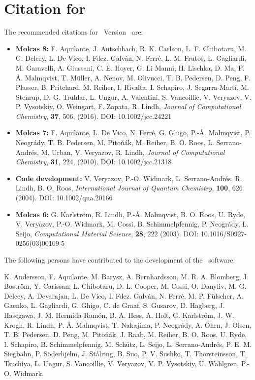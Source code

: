 
\section{Citation for \molcas}

The recommended citations for \molcas\ Version \molcasversion\ are:

\begin{itemize}

\item[] {\bf Molcas 8: } F. Aquilante, J. Autschbach, R. K. Carlson, L. F. Chibotaru,
M. G. Delcey, L. De Vico, I. Fdez. Galv\'an, N. Ferr\'e, L. M. Frutos, L. Gagliardi,
M. Garavelli, A. Giussani, C. E. Hoyer, G. Li Manni, H. Lischka, D. Ma, P. \AA. Malmqvist,
T. M\"uller, A. Nenov, M. Olivucci, T. B. Pedersen, D. Peng, F. Plasser, B. Pritchard,
M. Reiher, I. Rivalta, I. Schapiro, J. Segarra-Mart\'i, M. Stenrup, D. G. Truhlar,
L. Ungur, A. Valentini, S. Vancoillie, V. Veryazov, V. P. Vysotskiy, O. Weingart,
F. Zapata, R. Lindh, {\em Journal of Computational Chemistry}, {\bf 37}, 506, (2016).
DOI: 10.1002/jcc.24221

\item[] {\bf Molcas 7: } F. Aquilante, L. De Vico, N. Ferr\'e, G. Ghigo,
P.-{\AA}. Malmqvist, P. Neogr\'{a}dy, T. B. Pedersen, M. Pito\v{n}\'ak, M. Reiher,
B. O. Roos, L. Serrano-Andr\'es, M. Urban, V. Veryazov, R. Lindh,
{\em Journal of Computational Chemistry}, {\bf 31}, 224, (2010).
DOI: 10.1002/jcc.21318

\item[] {\bf Code development: }  V. Veryazov, P.-O. Widmark, L. Serrano-Andr\'es, R. Lindh, B. O. Roos,
{\em International Journal of Quantum Chemistry}, {\bf 100}, 626 (2004).
DOI: 10.1002/qua.20166

\item[] {\bf Molcas 6: } G. Karlstr{\"o}m, R. Lindh, P.-{\AA}. Malmqvist, B. O. Roos, U. Ryde,
V. Veryazov, P.-O. Widmark, M. Cossi, B. Schimmelpfennig, P. Neogr\'{a}dy, L. Seijo,
{\em Computational Material Science}, {\bf 28}, 222 (2003).
DOI: 10.1016/S0927-0256(03)00109-5

\end{itemize}

The following persons have contributed to the development of the
\molcas\ software:

K. Andersson,
F. Aquilante,
M. Barysz,
A. Bernhardsson,
M. R. A. Blomberg,
J. Bostr\"om,
Y. Carissan,
L. Chibotaru,
D. L. Cooper,
M. Cossi,
O. Danyliv,
M. G. Delcey,
A. Devarajan,
L. De Vico,
I. Fdez. Galv\'an,
N. Ferr\'e,
M. P. F\"ulscher,
A. Gaenko,
L. Gagliardi,
G. Ghigo,
C. de Graaf,
S. Gusarov,
D. Hagberg,
J. Hasegawa,
J. M. Hermida-Ram\'on,
B. A. Hess,
A. Holt,
G. Karlstr\"om,
J. W. Krogh,
R. Lindh,
P. {\AA}. Malmqvist,
T. Nakajima,
P. Neogr\'ady,
A. {\"O}hrn,
J. Olsen,
T. B. Pedersen,
D. Peng,
M. Pito\v{n}\'ak,
J. Raab,
M. Reiher,
B. O. Roos,
U. Ryde,
I. Schapiro,
B. Schimmelpfennig,
M. Sch\"utz,
L. Seijo,
L. Serrano-Andr\'es,
P. E. M. Siegbahn,
P. S{\"o}derhjelm,
J. St{\aa}lring,
B. Suo,
P. V. Sushko,
T. Thorsteinsson,
T. Tsuchiya,
L. Ungur,
S. Vancoillie,
V. Veryazov,
V. P. Vysotskiy,
U. Wahlgren,
P.-O. Widmark.

